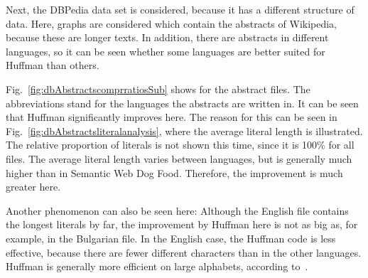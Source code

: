 Next, the DBPedia data set is considered, because it has a different structure of data. Here, graphs are considered which contain the abstracts of Wikipedia, because these are longer texts. In addition, there are abstracts in different languages, so it can be seen whether some languages are better suited for Huffman than others.

Fig.~\ref{fig:dbAbstractscomprratiosSub} shows  for the abstract files. The abbreviations stand for the languages the abstracts are written in. It can be seen that Huffman significantly improves  here. The reason for this can be seen in Fig.~\ref{fig:dbAbstractsliteralanalysis}, where the average literal length is illustrated. The relative proportion of literals is not shown this time, since it is 100\% for all files. The average literal length varies between languages, but is generally much higher than in Semantic Web Dog Food. Therefore, the improvement is much greater here.

Another phenomenon can also be seen here: Although the English file contains the longest literals by far, the improvement by Huffman here is not as big as, for example, in the Bulgarian file. In the English case, the Huffman code is less effective, because there are fewer different characters than in the other languages. Huffman is generally more efficient on large alphabets, according to~\cite{huffman}.

